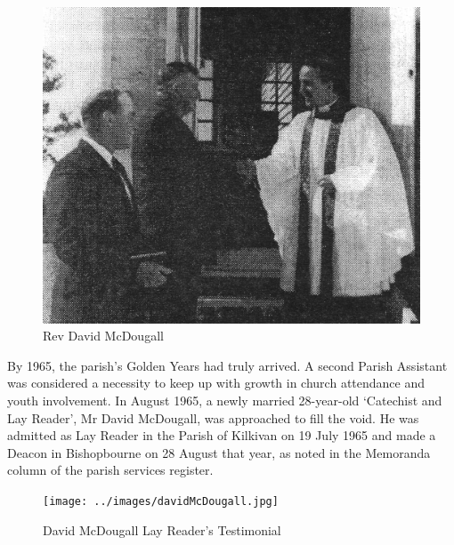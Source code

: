 \begin{figure}
\begin{center}
\includegraphics[width=1.\linewidth,center]{../images/DMcDougall.jpg}
\caption{Rev David McDougall}
\end{center}
\end{figure}




By 1965, the parish's Golden Years had truly arrived. A second Parish Assistant was considered a necessity to keep up with growth in church attendance and youth involvement. In August 1965, a newly married 28-year-old `Catechist and Lay Reader', Mr David McDougall, was approached to fill the void. He was admitted as Lay Reader in the Parish of Kilkivan on 19 July 1965 and made a Deacon in Bishopbourne on 28 August that year, as noted in the Memoranda column of the parish services register.









\begin{figure}[!htb]
\begin{center}
\texttt{[image: ../images/davidMcDougall.jpg]}
\caption{David McDougall Lay Reader's Testimonial}
\end{center}
\end{figure}




